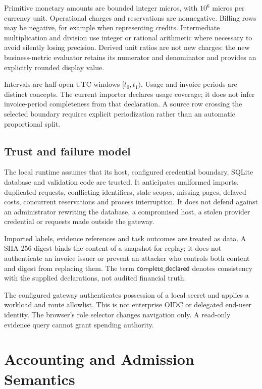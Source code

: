 \documentclass[10pt,twocolumn]{article}
\newcommand{\declared}{\mathsf{complete\_declared}}
\begin{document}
Primitive monetary amounts are bounded integer micros, with $10^6$ micros per currency unit. Operational charges and reservations are nonnegative. Billing rows may be negative, for example when representing credits. Intermediate multiplication and division use integer or rational arithmetic where necessary to avoid silently losing precision. Derived unit ratios are not new charges: the new business-metric evaluator retains its numerator and denominator and provides an explicitly rounded display value.

Intervals are half-open UTC windows $[t_0,t_1)$. Usage and invoice periods are distinct concepts. The current importer declares usage coverage; it does not infer invoice-period completeness from that declaration. A source row crossing the selected boundary requires explicit periodization rather than an automatic proportional split.

\subsection{Trust and failure model}

The local runtime assumes that its host, configured credential boundary, SQLite database and validation code are trusted. It anticipates malformed imports, duplicated requests, conflicting identifiers, stale scopes, missing pages, delayed costs, concurrent reservations and process interruption. It does not defend against an administrator rewriting the database, a compromised host, a stolen provider credential or requests made outside the gateway.

Imported labels, evidence references and task outcomes are treated as data. A SHA-256 digest binds the content of a snapshot for replay; it does not authenticate an invoice issuer or prevent an attacker who controls both content and digest from replacing them. The term $\declared$ denotes consistency with the supplied declarations, not audited financial truth.

The configured gateway authenticates possession of a local secret and applies a workload and route allowlist. This is not enterprise OIDC or delegated end-user identity. The browser's role selector changes navigation only. A read-only evidence query cannot grant spending authority.

\section{Accounting and Admission Semantics}
\label{sec:semantics}
\end{document}
